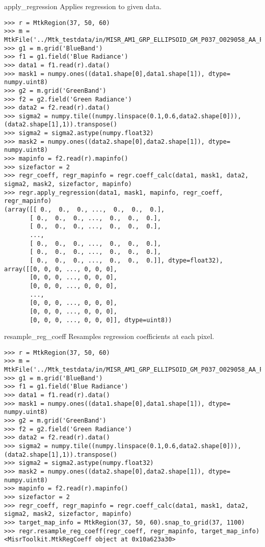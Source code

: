 \documentclass{howto}
\begin{document}
\begin{methoddesc}{apply_regression}{}
    Applies regression to given data.

\begin{verbatim}
>>> r = MtkRegion(37, 50, 60)
>>> m = MtkFile('../Mtk_testdata/in/MISR_AM1_GRP_ELLIPSOID_GM_P037_O029058_AA_F03_0024.hdf')
>>> g1 = m.grid('BlueBand')
>>> f1 = g1.field('Blue Radiance')
>>> data1 = f1.read(r).data()
>>> mask1 = numpy.ones((data1.shape[0],data1.shape[1]), dtype= numpy.uint8)
>>> g2 = m.grid('GreenBand')
>>> f2 = g2.field('Green Radiance')
>>> data2 = f2.read(r).data()
>>> sigma2 = numpy.tile((numpy.linspace(0.1,0.6,data2.shape[0])), (data2.shape[1],1)).transpose()
>>> sigma2 = sigma2.astype(numpy.float32)
>>> mask2 = numpy.ones((data2.shape[0],data2.shape[1]), dtype= numpy.uint8)
>>> mapinfo = f2.read(r).mapinfo()
>>> sizefactor = 2
>>> regr_coeff, regr_mapinfo = regr.coeff_calc(data1, mask1, data2, sigma2, mask2, sizefactor, mapinfo)
>>> regr.apply_regression(data1, mask1, mapinfo, regr_coeff, regr_mapinfo)
(array([[ 0.,  0.,  0., ...,  0.,  0.,  0.],
       [ 0.,  0.,  0., ...,  0.,  0.,  0.],
       [ 0.,  0.,  0., ...,  0.,  0.,  0.],
       ...,
       [ 0.,  0.,  0., ...,  0.,  0.,  0.],
       [ 0.,  0.,  0., ...,  0.,  0.,  0.],
       [ 0.,  0.,  0., ...,  0.,  0.,  0.]], dtype=float32), 
array([[0, 0, 0, ..., 0, 0, 0],
       [0, 0, 0, ..., 0, 0, 0],
       [0, 0, 0, ..., 0, 0, 0],
       ...,
       [0, 0, 0, ..., 0, 0, 0],
       [0, 0, 0, ..., 0, 0, 0],
       [0, 0, 0, ..., 0, 0, 0]], dtype=uint8))
\end{verbatim}
\end{methoddesc} 

\begin{methoddesc}{resample_reg_coeff}{}
    Resamples regression coefficients at each pixel.

\begin{verbatim}
>>> r = MtkRegion(37, 50, 60)
>>> m = MtkFile('../Mtk_testdata/in/MISR_AM1_GRP_ELLIPSOID_GM_P037_O029058_AA_F03_0024.hdf')
>>> g1 = m.grid('BlueBand')
>>> f1 = g1.field('Blue Radiance')
>>> data1 = f1.read(r).data()
>>> mask1 = numpy.ones((data1.shape[0],data1.shape[1]), dtype= numpy.uint8)
>>> g2 = m.grid('GreenBand')
>>> f2 = g2.field('Green Radiance')
>>> data2 = f2.read(r).data()
>>> sigma2 = numpy.tile((numpy.linspace(0.1,0.6,data2.shape[0])), (data2.shape[1],1)).transpose()
>>> sigma2 = sigma2.astype(numpy.float32)
>>> mask2 = numpy.ones((data2.shape[0],data2.shape[1]), dtype= numpy.uint8)
>>> mapinfo = f2.read(r).mapinfo()
>>> sizefactor = 2
>>> regr_coeff, regr_mapinfo = regr.coeff_calc(data1, mask1, data2, sigma2, mask2, sizefactor, mapinfo)
>>> target_map_info = MtkRegion(37, 50, 60).snap_to_grid(37, 1100)
>>> regr.resample_reg_coeff(regr_coeff, regr_mapinfo, target_map_info)
<MisrToolkit.MtkRegCoeff object at 0x10a623a30>
\end{verbatim}
\end{methoddesc}                    
\end{document}
